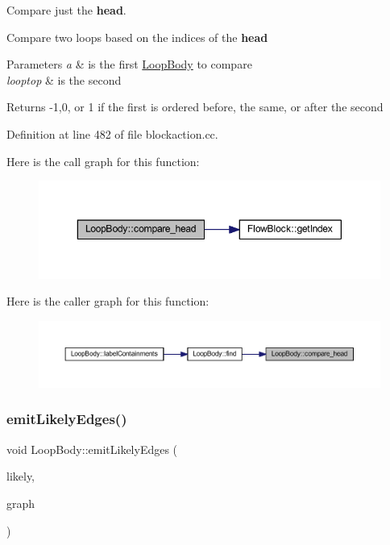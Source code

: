 Compare just the {\bfseries{head}}. 

Compare two loops based on the indices of the {\bfseries{head}} 
\begin{DoxyParams}{Parameters}
{\em a} & is the first \mbox{\hyperlink{class_loop_body}{Loop\+Body}} to compare \\
\hline
{\em looptop} & is the second \\
\hline
\end{DoxyParams}
\begin{DoxyReturn}{Returns}
-\/1,0, or 1 if the first is ordered before, the same, or after the second 
\end{DoxyReturn}


Definition at line 482 of file blockaction.\+cc.

Here is the call graph for this function\+:
\nopagebreak
\begin{figure}[H]
\begin{center}
\leavevmode
\includegraphics[width=350pt]{class_loop_body_aa21c0bf7e110479ebeb1590c8ef58542_cgraph}
\end{center}
\end{figure}
Here is the caller graph for this function\+:
\nopagebreak
\begin{figure}[H]
\begin{center}
\leavevmode
\includegraphics[width=350pt]{class_loop_body_aa21c0bf7e110479ebeb1590c8ef58542_icgraph}
\end{center}
\end{figure}
\mbox{\label{class_loop_body_ab172e6e4e585fe12494548b642e000fc}} 
\subsubsection{\texorpdfstring{emitLikelyEdges()}{emitLikelyEdges()}}
{\footnotesize\ttfamily void Loop\+Body\+::emit\+Likely\+Edges (\begin{DoxyParamCaption}\item[{list$<$ \mbox{\hyperlink{class_floating_edge}{Floating\+Edge}} $>$ \&}]{likely,  }\item[{\mbox{\hyperlink{class_flow_block}{Flow\+Block}} $\ast$}]{graph }\end{DoxyParamCaption})}



